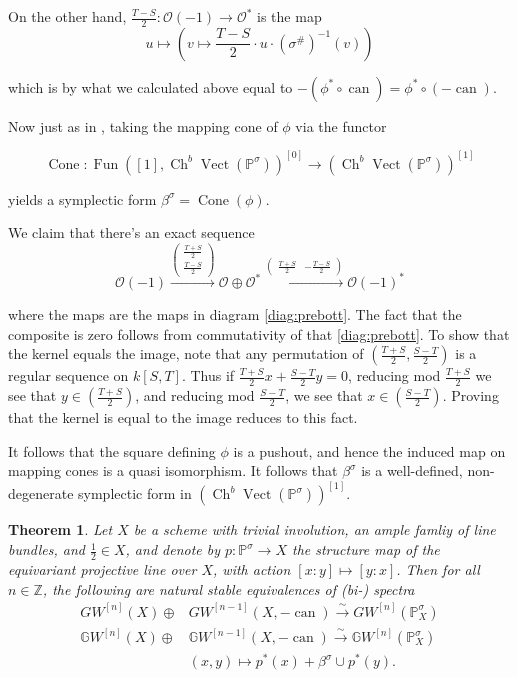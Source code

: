 \documentclass[draftthesis,tocnosub,noragright,centerchapter,10pt]{uiucthesis2009}
\newcommand{\mbb}{\mathbb}
\newcommand{\mc}{\mathcal}
\DeclareMathOperator{\can}{can}
\DeclareMathOperator{\Ch}{Ch}
\DeclareMathOperator{\Fun}{Fun}
\DeclareMathOperator{\Vect}{Vect}
\DeclareMathOperator{\Cone}{Cone}
\theoremstyle{plain}
\newtheorem{theorem}[lemma]{Theorem}
\theoremstyle{definition}
\begin{document}
On the other hand, $\frac{T-S}{2} :
\mc O(-1) \rightarrow \mc O^*$ is the map
\[
u \mapsto (v \mapsto \frac{T-S}{2} \cdot u \cdot (\sigma^\#)^{-1}(v))
\]

which is by what we calculated above equal to $-(\phi^* \circ \can) =
\phi^* \circ (-\can)$.

Now just as in \cite{Schder}, taking the mapping cone of $\phi$ via
the functor

\[
\Cone : \Fun([1],\Ch^b\Vect(\mbb P^\sigma))^{[0]} \rightarrow
\left(\Ch^b\Vect(\mathbb P^\sigma)\right)^{[1]}
\]

yields a symplectic form $\beta^\sigma = \Cone(\phi)$. 

We claim that there's an exact sequence
\[
\mc O(-1) \xrightarrow{\begin{pmatrix}\frac{T+S}{2} \\ \frac{T-S}{2} \end{pmatrix}} \mc O \oplus \mc O^* \xrightarrow{\begin{pmatrix}\frac{T+S}{2} & -\frac{T-S}{2} \end{pmatrix}} \mc O(-1)^*
\]

where the maps are the maps in diagram \ref{diag:prebott}. The fact
that the composite is zero follows from commutativity of that
\ref{diag:prebott}. To show that the kernel equals the image, note
that any permutation of $(\frac{T+S}{2},\frac{S-T}{2})$ is a regular sequence on
$k[S,T]$. Thus if  $\frac{T+S}{2}x + \frac{S-T}{2}y = 0$, reducing mod
$\frac{T+S}{2}$ we see that $y \in (\frac{T+S}{2})$, and reducing mod
$\frac{S-T}{2}$, we see that $x \in (\frac{S-T}{2})$. Proving that the
kernel is equal to the image reduces to this fact.


It follows that the square defining $\phi$ is a pushout, and hence the induced map on
mapping cones is a quasi isomorphism. It follows that $\beta^\sigma$
is a well-defined, non-degenerate symplectic form in
$\left(\Ch^b\Vect(\mathbb P^\sigma)\right)^{[1]}$. 



\begin{theorem} \label{thm:proj_inv}
Let $X$ be a scheme with trivial involution, an ample famliy of line
bundles, and $\frac{1}{2} \in X$, and denote by $p : \mbb P^\sigma
\rightarrow X$ the structure map of the equivariant projective line
over $X$, with action $[x:y] \mapsto [y:x]$. Then for all $n \in \mbb
Z$, the following are natural stable equivalences of (bi-) spectra
\begin{align*}
GW^{[n]}(X) \oplus & GW^{[n-1]}(X,-\can) \xrightarrow{\sim}
GW^{[n]}(\mbb P^\sigma_X)\\
 \mbb GW^{[n]}(X) \oplus & \mbb GW^{[n-1]}(X,-\can) \xrightarrow{\sim}
\mbb GW^{[n]}(\mbb P^\sigma_X)\\
&(x,y) \mapsto p^*(x) + \beta^\sigma \cup p^*(y).
\end{align*}
\end{theorem}
\end{document}
